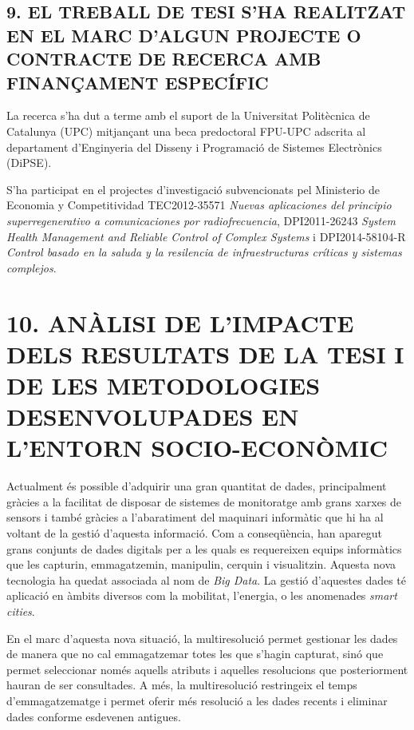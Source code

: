 \documentclass{scrartcl}
\begin{document}
\subsection*{9. EL TREBALL DE TESI S’HA REALITZAT EN EL MARC D’ALGUN PROJECTE O CONTRACTE DE RECERCA AMB FINANÇAMENT ESPECÍFIC}


La recerca s'ha dut a terme amb el suport de la Universitat
Politècnica de Catalunya (UPC) mitjançant una beca predoctoral FPU-UPC
adscrita al departament d'Enginyeria del Disseny i Programació de
Sistemes Electrònics (DiPSE).

S'ha participat en el projectes d'investigació subvencionats pel
Ministerio de Economia y Competitividad TEC2012-35571 \emph{Nuevas
  aplicaciones del principio superregenerativo a comunicaciones por
  radiofrecuencia}, DPI2011-26243 \emph{System Health Management and
  Reliable Control of Complex Systems} i DPI2014-58104-R \emph{Control
  basado en la saluda y la resilencia de infraestructuras críticas y
  sistemas complejos}.


\section*{10. ANÀLISI DE L’IMPACTE DELS RESULTATS DE LA TESI I DE LES METODOLOGIES DESENVOLUPADES EN L’ENTORN SOCIO-ECONÒMIC}
  

Actualment és possible d'adquirir una gran quantitat de dades,
principalment gràcies a la facilitat de disposar de sistemes de
monitoratge amb grans xarxes de sensors i també gràcies a
l'abaratiment del maquinari informàtic que hi ha al voltant de la
gestió d'aquesta informació.  Com a conseqüència, han aparegut grans
conjunts de dades digitals per a les quals es requereixen equips
informàtics que les capturin, emmagatzemin, manipulin, cerquin i
visualitzin. Aquesta nova tecnologia ha quedat associada al nom de
\emph{Big Data}.  La gestió d’aquestes dades té aplicació en àmbits
diversos com la mobilitat, l’energia, o les  anomenades
\emph{smart cities}.




En el marc d'aquesta nova situació, la multiresolució permet gestionar
les dades de manera que no cal emmagatzemar totes les que s'hagin
capturat, sinó que permet seleccionar només aquells atributs i
aquelles resolucions que posteriorment hauran de ser consultades.  A
més, la multiresolució restringeix el temps
d'emmagatzematge i permet oferir més resolució a les dades recents i
eliminar dades conforme esdevenen antigues.
\end{document}
